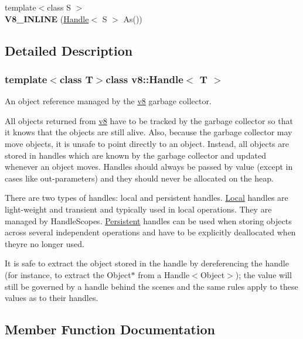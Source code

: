 \begin{DoxyCompactItemize}
\item 
\hypertarget{classv8_1_1_handle_ad78a29a0d4766f2e0e0a4d95a047efc3}{}{\footnotesize template$<$class S $>$ }\\{\bfseries V8\+\_\+\+I\+N\+L\+I\+N\+E} (\hyperlink{classv8_1_1_handle}{Handle}$<$ S $>$ As())\label{classv8_1_1_handle_ad78a29a0d4766f2e0e0a4d95a047efc3}

\end{DoxyCompactItemize}


\subsection{Detailed Description}
\subsubsection*{template$<$class T$>$class v8\+::\+Handle$<$ T $>$}

An object reference managed by the \hyperlink{namespacev8}{v8} garbage collector.

All objects returned from \hyperlink{namespacev8}{v8} have to be tracked by the garbage collector so that it knows that the objects are still alive. Also, because the garbage collector may move objects, it is unsafe to point directly to an object. Instead, all objects are stored in handles which are known by the garbage collector and updated whenever an object moves. Handles should always be passed by value (except in cases like out-\/parameters) and they should never be allocated on the heap.

There are two types of handles\+: local and persistent handles. \hyperlink{classv8_1_1_local}{Local} handles are light-\/weight and transient and typically used in local operations. They are managed by Handle\+Scopes. \hyperlink{classv8_1_1_persistent}{Persistent} handles can be used when storing objects across several independent operations and have to be explicitly deallocated when they\textquotesingle{}re no longer used.

It is safe to extract the object stored in the handle by dereferencing the handle (for instance, to extract the Object$\ast$ from a Handle$<$\+Object$>$); the value will still be governed by a handle behind the scenes and the same rules apply to these values as to their handles. 

\subsection{Member Function Documentation}
\hypertarget{classv8_1_1_handle_a0005cb917206b7e4800d19d4eca68e21}{}
